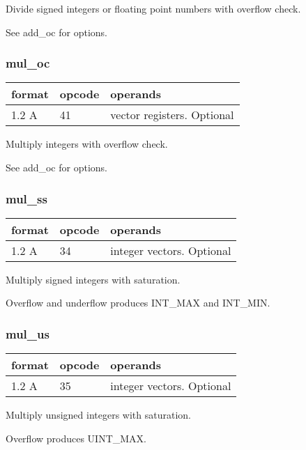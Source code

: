 \documentclass[forwardcom.tex]{subfiles}
\begin{document}
Divide signed integers or floating point numbers with overflow check.

See add\_oc for options.

\subsubsection{mul\_oc}
\label{table:mulOcInstruction}
\begin{tabular}{|p{12mm}|p{12mm}|p{110mm}|}
\hline
\bfseries format & \bfseries opcode & \bfseries operands \\ \hline
1.2 A & 41 & vector registers. Optional \\ \hline
\end{tabular}
\vspace{2mm}

Multiply integers with overflow check.

See add\_oc for options.

\subsubsection{mul\_ss}
\label{table:mulSsInstruction}
\begin{tabular}{|p{12mm}|p{12mm}|p{110mm}|}
\hline
\bfseries format & \bfseries opcode & \bfseries operands \\ \hline
1.2 A & 34 & integer vectors. Optional \\ \hline
\end{tabular}
\vspace{2mm}

Multiply signed integers with saturation.

Overflow and underflow produces INT\_MAX and INT\_MIN.

\subsubsection{mul\_us}
\label{table:mulUsInstruction}
\begin{tabular}{|p{12mm}|p{12mm}|p{110mm}|}
\hline
\bfseries format & \bfseries opcode & \bfseries operands \\ \hline
1.2 A & 35 & integer vectors. Optional \\ \hline
\end{tabular}
\vspace{2mm}

Multiply unsigned integers with saturation.

Overflow produces UINT\_MAX.
\end{document}
